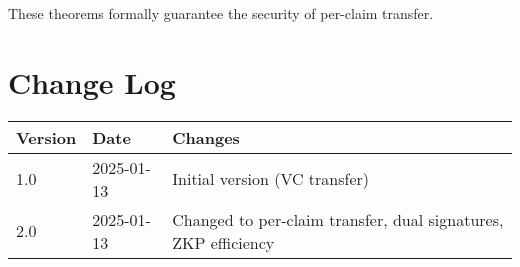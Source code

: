 These theorems formally guarantee the security of per-claim transfer.

\section{Change Log}

\begin{table}[H]
\centering
\begin{tabular}{|l|l|l|}
\hline
\textbf{Version} & \textbf{Date} & \textbf{Changes} \\
\hline
1.0 & 2025-01-13 & Initial version (VC transfer) \\
\hline
2.0 & 2025-01-13 & Changed to per-claim transfer, dual signatures, ZKP efficiency \\
\hline
\end{tabular}
\end{table}
